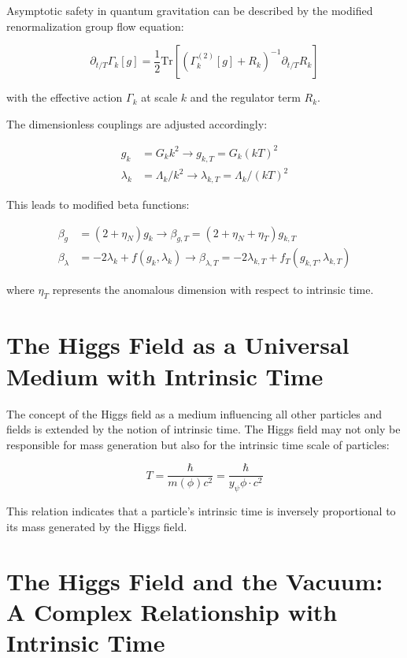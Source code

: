 \documentclass{article}
\begin{document}
Asymptotic safety in quantum gravitation can be described by the modified renormalization group flow equation:

\begin{equation}
	\partial_{t/T} \Gamma_k[g] = \frac{1}{2} \text{Tr}\left[\left(\Gamma_k^{(2)}[g] + R_k\right)^{-1} \partial_{t/T} R_k\right]
\end{equation}

with the effective action \(\Gamma_k\) at scale \(k\) and the regulator term \(R_k\).

The dimensionless couplings are adjusted accordingly:

\begin{align}
	g_k &= G_k k^2 \rightarrow g_{k,T} = G_k (kT)^2 \\
	\lambda_k &= \Lambda_k/k^2 \rightarrow \lambda_{k,T} = \Lambda_k/(kT)^2
\end{align}

This leads to modified beta functions:

\begin{align}
	\beta_g &= (2 + \eta_N)g_k \rightarrow \beta_{g,T} = (2 + \eta_N + \eta_T)g_{k,T} \\
	\beta_\lambda &= -2\lambda_k + f(g_k,\lambda_k) \rightarrow \beta_{\lambda,T} = -2\lambda_{k,T} + f_T(g_{k,T},\lambda_{k,T})
\end{align}

where \(\eta_T\) represents the anomalous dimension with respect to intrinsic time.

\section{The Higgs Field as a Universal Medium with Intrinsic Time}

The concept of the Higgs field as a medium influencing all other particles and fields is extended by the notion of intrinsic time. The Higgs field may not only be responsible for mass generation but also for the intrinsic time scale of particles:

\begin{equation}
	T = \frac{\hbar}{m(\phi)c^2} = \frac{\hbar}{y_\psi \phi \cdot c^2}
\end{equation}

This relation indicates that a particle’s intrinsic time is inversely proportional to its mass generated by the Higgs field.

\section{The Higgs Field and the Vacuum: A Complex Relationship with Intrinsic Time}
\end{document}
